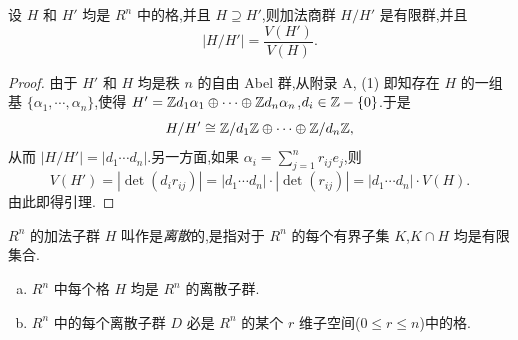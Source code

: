 \begin{lemma}\label{lem:ch3-1}
设 $H$ 和 $H'$ 均是 $R^n$ 中的格,并且 $H\supseteq H'$,则加法商群 $H/H'$ 是有限群,并且
\[
  |H/H'|=\frac{V(H')}{V(H)}.
\]
\end{lemma}

\begin{proof}
由于 $H'$ 和 $H$ 均是秩 $n$ 的自由 Abel 群,从附录 A, (1) 即知存在 $H$ 的一组基 $\{\alpha_1,\cdots,\alpha_n\}$,使得 $H'=\mathbb{Z} d_1\alpha_1\oplus\cdots\oplus\mathbb{Z} d_n\alpha_n$,$d_i\in\mathbb{Z}-\{0\}$.于是
\[
  H/H'\cong\mathbb{Z}/d_1\mathbb{Z}\oplus\cdots\oplus\mathbb{Z}/d_n\mathbb{Z},
\]
从而 $|H/H'|=|d_1\cdots d_n|$.另一方面,如果 $\alpha_i=\sum_{j=1}^{n}r_{ij}e_j$,则
\[
  V(H')=|\det(d_ir_{ij})|=|d_1\cdots d_n|\cdot|\det(r_{ij})|=|d_1\cdots d_n|\cdot V(H).
\]
由此即得引理.
\end{proof}

\begin{definition}\label{def:ch3-2}
$R^n$ 的加法子群 $H$ 叫作是\emph{离散}的,是指对于 $R^n$ 的每个有界子集 $K$,$K\cap H$ 均是有限集合.
\end{definition}

\begin{lemma}\label{lem:ch3-2}
\begin{enumerate}[(a)]
  \item $R^n$ 中每个格 $H$ 均是 $R^n$ 的离散子群.
  \item $R^n$ 中的每个离散子群 $D$ 必是 $R^n$ 的某个 $r$ 维子空间($0\leqslant r\leqslant n$)中的格.
\end{enumerate}
\end{lemma}

